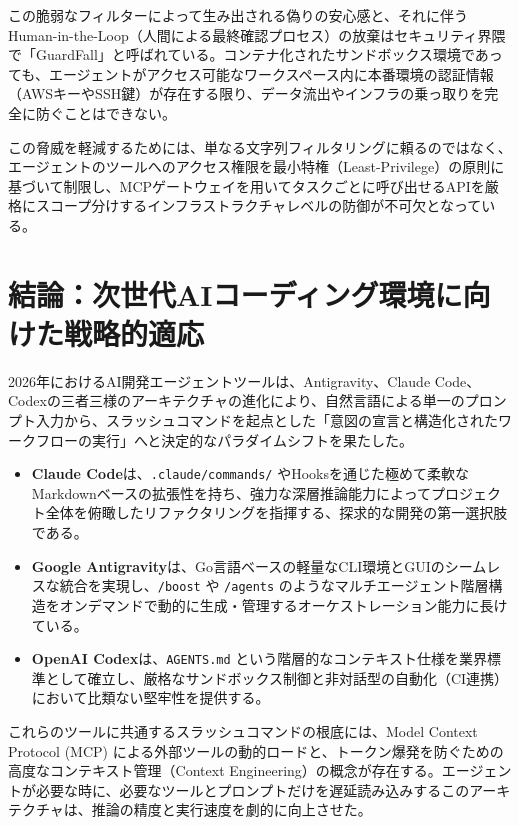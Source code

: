 \documentclass[a4paper,11pt]{ltjsarticle}
\newcommand{\cmd}[1]{\texttt{#1}}
\begin{document}
この脆弱なフィルターによって生み出される偽りの安心感と、それに伴うHuman-in-the-Loop（人間による最終確認プロセス）の放棄はセキュリティ界隈で「GuardFall」と呼ばれている\cite{r58}。コンテナ化されたサンドボックス環境であっても、エージェントがアクセス可能なワークスペース内に本番環境の認証情報（AWSキーやSSH鍵）が存在する限り、データ流出やインフラの乗っ取りを完全に防ぐことはできない\cite{r54}。

この脅威を軽減するためには、単なる文字列フィルタリングに頼るのではなく、エージェントのツールへのアクセス権限を最小特権（Least-Privilege）の原則に基づいて制限し、MCPゲートウェイを用いてタスクごとに呼び出せるAPIを厳格にスコープ分けするインフラストラクチャレベルの防御が不可欠となっている\cite{r53}。

\section{結論：次世代AIコーディング環境に向けた戦略的適応}

2026年におけるAI開発エージェントツールは、Antigravity、Claude Code、Codexの三者三様のアーキテクチャの進化により、自然言語による単一のプロンプト入力から、スラッシュコマンドを起点とした「意図の宣言と構造化されたワークフローの実行」へと決定的なパラダイムシフトを果たした。

\begin{itemize}
\item \textbf{Claude Code}は、\cmd{.claude/commands/} やHooksを通じた極めて柔軟なMarkdownベースの拡張性を持ち、強力な深層推論能力によってプロジェクト全体を俯瞰したリファクタリングを指揮する、探求的な開発の第一選択肢である。
\item \textbf{Google Antigravity}は、Go言語ベースの軽量なCLI環境とGUIのシームレスな統合を実現し、\cmd{/boost} や \cmd{/agents} のようなマルチエージェント階層構造をオンデマンドで動的に生成・管理するオーケストレーション能力に長けている。
\item \textbf{OpenAI Codex}は、\cmd{AGENTS.md} という階層的なコンテキスト仕様を業界標準として確立し、厳格なサンドボックス制御と非対話型の自動化（CI連携）において比類ない堅牢性を提供する。
\end{itemize}

これらのツールに共通するスラッシュコマンドの根底には、Model Context Protocol (MCP) による外部ツールの動的ロードと、トークン爆発を防ぐための高度なコンテキスト管理（Context Engineering）の概念が存在する。エージェントが必要な時に、必要なツールとプロンプトだけを遅延読み込みするこのアーキテクチャは、推論の精度と実行速度を劇的に向上させた。
\end{document}
